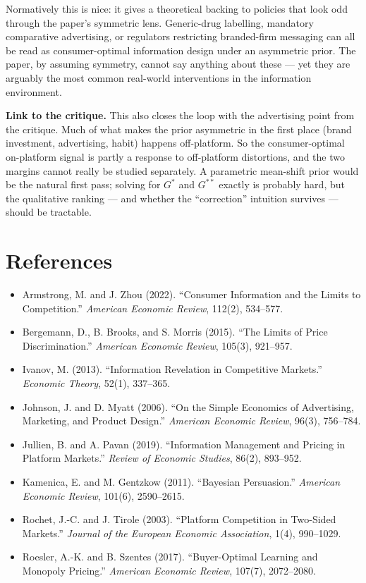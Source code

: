 \documentclass[12pt, a4paper]{article}
\begin{document}
Normatively this is nice: it gives a theoretical backing to policies that look odd through the paper's symmetric lens. Generic-drug labelling, mandatory comparative advertising, or regulators restricting branded-firm messaging can all be read as consumer-optimal information design under an asymmetric prior. The paper, by assuming symmetry, cannot say anything about these --- yet they are arguably the most common real-world interventions in the information environment.

\textbf{Link to the critique.} This also closes the loop with the advertising point from the critique. Much of what makes the prior asymmetric in the first place (brand investment, advertising, habit) happens off-platform. So the consumer-optimal on-platform signal is partly a response to off-platform distortions, and the two margins cannot really be studied separately. A parametric mean-shift prior would be the natural first pass; solving for $G^*$ and $G^{**}$ exactly is probably hard, but the qualitative ranking --- and whether the ``correction'' intuition survives --- should be tractable.

\section*{References}

\begin{itemize}[nosep, leftmargin=*]
    \item Armstrong, M. and J. Zhou (2022). ``Consumer Information and the Limits to Competition.'' \textit{American Economic Review}, 112(2), 534--577.
    \item Bergemann, D., B. Brooks, and S. Morris (2015). ``The Limits of Price Discrimination.'' \textit{American Economic Review}, 105(3), 921--957.
    \item Ivanov, M. (2013). ``Information Revelation in Competitive Markets.'' \textit{Economic Theory}, 52(1), 337--365.
    \item Johnson, J. and D. Myatt (2006). ``On the Simple Economics of Advertising, Marketing, and Product Design.'' \textit{American Economic Review}, 96(3), 756--784.
    \item Jullien, B. and A. Pavan (2019). ``Information Management and Pricing in Platform Markets.'' \textit{Review of Economic Studies}, 86(2), 893--952.
    \item Kamenica, E. and M. Gentzkow (2011). ``Bayesian Persuasion.'' \textit{American Economic Review}, 101(6), 2590--2615.
    \item Rochet, J.-C. and J. Tirole (2003). ``Platform Competition in Two-Sided Markets.'' \textit{Journal of the European Economic Association}, 1(4), 990--1029.
    \item Roesler, A.-K. and B. Szentes (2017). ``Buyer-Optimal Learning and Monopoly Pricing.'' \textit{American Economic Review}, 107(7), 2072--2080.
\end{itemize}
\end{document}
